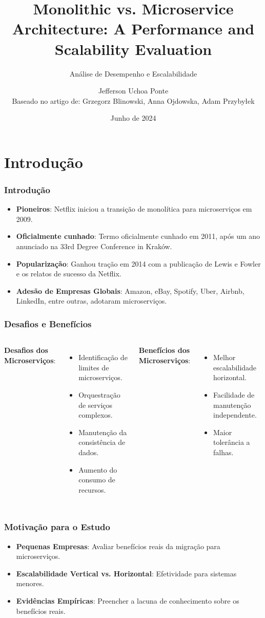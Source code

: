 \documentclass{beamer}
\title[Monolithic vs. Microservices] %
{Monolithic vs. Microservice Architecture: A Performance and Scalability Evaluation}
\subtitle{Análise de Desempenho e Escalabilidade}
\author[Jefferson Uchoa Ponte] %
{Jefferson Uchoa Ponte\\
Baseado no artigo de: Grzegorz Blinowski, Anna Ojdowska, Adam Przybyłek}
\institute[UECE] %
{
  Universidade Estadual do Ceará (UECE) \\
  Engenharia de Software \\
  Prof. Matheus Paixão
}
\date[Junho 2024] %
{Junho de 2024}
\begin{document}
\frame{\titlepage}

\section{Introdução}

\begin{frame}
\frametitle{Introdução}
\begin{itemize}
    \item \textbf{Pioneiros}: Netflix iniciou a transição de monolítica para microserviços em 2009.
    \item \textbf{Oficialmente cunhado}: Termo oficialmente cunhado em 2011, após um ano anunciado na 33rd Degree Conference in Kraków.
    \item \textbf{Popularização}: Ganhou tração em 2014 com a publicação de Lewis e Fowler e os relatos de sucesso da Netflix.
    \item \textbf{Adesão de Empresas Globais}: Amazon, eBay, Spotify, Uber, Airbnb, LinkedIn, entre outras, adotaram microserviços.
\end{itemize}
\end{frame}

\begin{frame}
\frametitle{Desafios e Benefícios}
\begin{columns}
    \textbf{Desafios dos Microserviços}:
    \begin{itemize}
        \item Identificação de limites de microserviços.
        \item Orquestração de serviços complexos.
        \item Manutenção da consistência de dados.
        \item Aumento do consumo de recursos.
    \end{itemize}

    \textbf{Benefícios dos Microserviços}:
    \begin{itemize}
        \item Melhor escalabilidade horizontal.
        \item Facilidade de manutenção independente.
        \item Maior tolerância a falhas.
    \end{itemize}
\end{columns}
\end{frame}

\begin{frame}
\frametitle{Motivação para o Estudo}
\begin{itemize}
    \item \textbf{Pequenas Empresas}: Avaliar benefícios reais da migração para microserviços.
    \item \textbf{Escalabilidade Vertical vs. Horizontal}: Efetividade para sistemas menores.
    \item \textbf{Evidências Empíricas}: Preencher a lacuna de conhecimento sobre os benefícios reais.
\end{itemize}
\end{frame}
\end{document}
